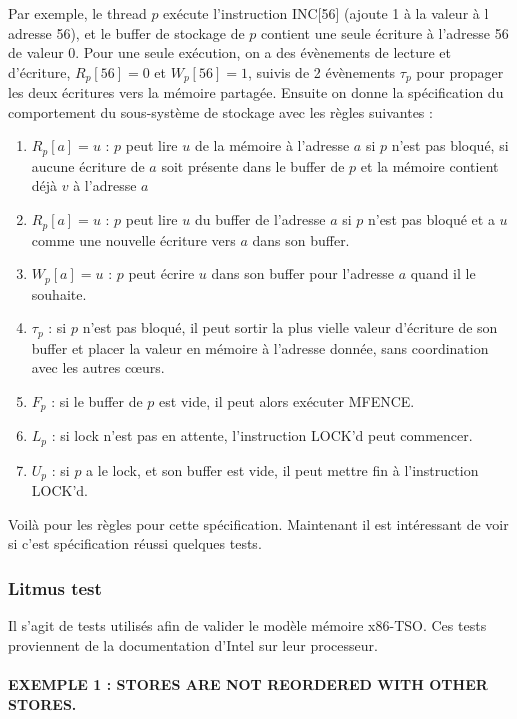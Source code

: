 \documentclass[12pt,a4paper]{article}
\begin{document}
Par exemple, le thread $p$ exécute l'instruction INC[56] (ajoute 1 à la valeur à l adresse 56), et le buffer de stockage de $p$ contient une seule écriture à l'adresse 56 de valeur 0. Pour une seule exécution, on a des évènements de lecture et d'écriture, $R_p[56] = 0$ et $W_p[56] = 1$, suivis de 2 évènements $\tau_p$ pour propager les deux écritures vers la mémoire partagée.
Ensuite on donne la spécification du comportement du sous-système de stockage avec les règles suivantes :
\begin{enumerate}
	\item $R_p[a] = u$ : $p$ peut lire $u$ de la mémoire à l'adresse $a$ si $p$ n'est pas bloqué, si aucune écriture de $a$ soit présente dans le buffer de $p$ et la mémoire contient déjà $v$ à l'adresse $a$
	\item $R_p[a] = u$ : $p$ peut lire $u$ du buffer de l'adresse $a$ si $p$ n'est pas bloqué et a $u$ comme une nouvelle écriture vers $a$ dans son buffer.
	\item $W_p[a] = u$ : $p$ peut écrire $u$ dans son buffer pour l'adresse $a$ quand il le souhaite.
	\item $\tau_p$ : si $p$ n'est pas bloqué, il peut sortir la plus vielle valeur d'écriture de son buffer et placer la valeur en mémoire à l'adresse donnée, sans coordination avec les autres cœurs.
	\item $F_p$ : si le buffer de $p$ est vide, il peut alors exécuter MFENCE.
	\item $L_p$ : si lock n'est pas en attente, l'instruction LOCK'd peut commencer.
	\item $U_p$ : si $p$ a le lock, et son buffer est vide, il peut mettre fin à l'instruction LOCK'd.
\end{enumerate}

Voilà pour les règles pour cette spécification. Maintenant il est intéressant de voir si c'est spécification réussi quelques tests.

\subsubsection*{Litmus test}

Il s'agit de tests utilisés afin de valider le modèle mémoire x86-TSO. Ces tests proviennent de la documentation d'Intel sur leur processeur.

\paragraph{EXEMPLE 1 : STORES ARE NOT REORDERED WITH OTHER STORES.}
\end{document}
